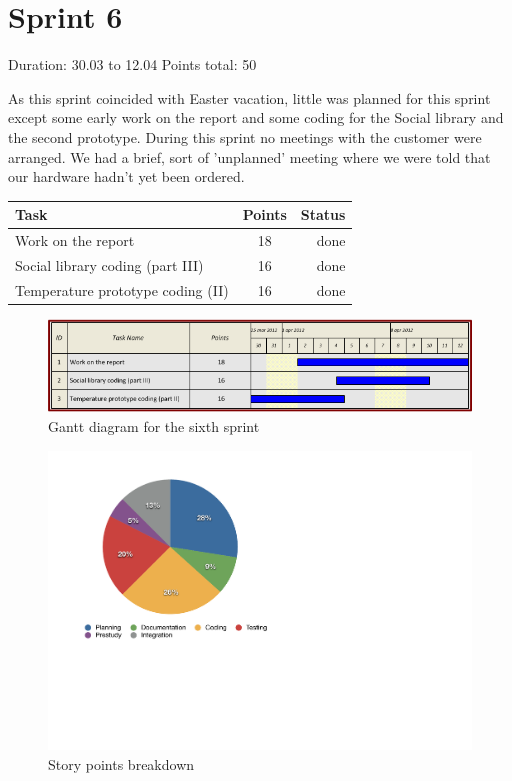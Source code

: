\newpage

\section{Sprint 6}

Duration: 30.03 to 12.04
Points total: 50

As this sprint coincided with Easter vacation, little
was planned for this sprint except some early work on the report
and some coding for the Social library and the second prototype.
During this sprint no meetings with the customer were arranged.
We had a brief, sort of 'unplanned' meeting where we were told
that our hardware hadn't yet been ordered.

\begin{table}[ht!]
\begin{tabular}{ | l | c | r | }

\hline
\textbf{Task} & \textbf{Points} & \textbf{Status} \\
\hline

Work on the report			& 18 & done \\
\hline
Social library coding (part III)	& 16 & done \\
\hline
Temperature prototype coding (II)	& 16 & done \\
\hline

\end{tabular}
\end{table}

\begin{figure}[h!]
\centering \includegraphics[scale=0.8]{img/sprints-gantt6.png}
\caption{Gantt diagram for the sixth sprint}
\label{fig:sprints-gantt6}
\end{figure}


\begin{figure}[h!]
\centering \includegraphics[scale=0.8]{img/pie_chart.pdf}
\caption{Story points breakdown}
\label{fig:sprints-points}
\end{figure}

